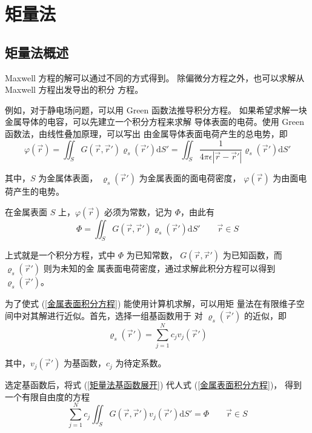 \chapter{矩量法}

\section{矩量法概述}

\par Maxwell 方程的解可以通过不同的方式得到。
除偏微分方程之外，也可以求解从 Maxwell 方程出发导出的积分
方程。

\par 例如，对于静电场问题，可以用 Green 函数法推导积分方程。
如果希望求解一块金属导体的电容，可以先建立一个积分方程来求解
导体表面的电荷。使用 Green 函数法，由线性叠加原理，可以写出
由金属导体表面电荷产生的总电势，即
\begin{equation}
    \varphi(\vec{r}) = 
    \iint_{S} G(\vec{r}, \vec{r}') \varrho_s(\vec{r}') \text{d}S'
    =\iint_{S} \frac{1}{4\pi\epsilon\left|\vec{r}-\vec{r}'\right|} 
    \varrho_s(\vec{r}') \text{d}S'
\end{equation}
\par 其中，$S$ 为金属体表面，
$\varrho_s(\vec{r}')$ 为金属表面的面电荷密度，
$\varphi(\vec{r})$ 为由面电荷产生的电势。
\par 在金属表面 $S$ 上，$\varphi(\vec{r})$
必须为常数，记为 $\Phi$，由此有
\begin{equation}
    \Phi = 
    \iint_{S} G(\vec{r}, \vec{r}') \varrho_s(\vec{r}') \text{d}S'
    \qquad
    \vec{r} \in S
    \label{金属表面积分方程}
\end{equation}
\par 上式就是一个积分方程，式中 $\Phi$ 为已知常数，
$G(\vec{r}, \vec{r}')$ 为已知函数，而 $\varrho_s(\vec{r}')$ 则为未知的金
属表面电荷密度，通过求解此积分方程可以得到 $\varrho_s(\vec{r}')$。
\par 为了使式 (\ref{金属表面积分方程}) 能使用计算机求解，可以用矩
量法在有限维子空间中对其解进行近似。首先，选择一组基函数用于
对 $\varrho_s(\vec{r}')$ 的近似，即
\begin{equation}
    \varrho_s(\vec{r}') = \sum_{j=1}^{N} c_j v_j(\vec{r}')
    \label{矩量法基函数展开}
\end{equation}
\par 其中，$v_j(\vec{r}')$ 为基函数，$c_j$ 为待定系数。
\par 选定基函数后，将式 (\ref{矩量法基函数展开}) 代人式 (\ref{金属表面积分方程})，
得到一个有限自由度的方程
\begin{equation}
    \sum_{j=1}^{N} c_j 
    \iint_{S} G(\vec{r}, \vec{r}') v_j(\vec{r}') \text{d}S'
    =\Phi
    \qquad
    \vec{r} \in S
    \label{矩量法方程}
\end{equation}
